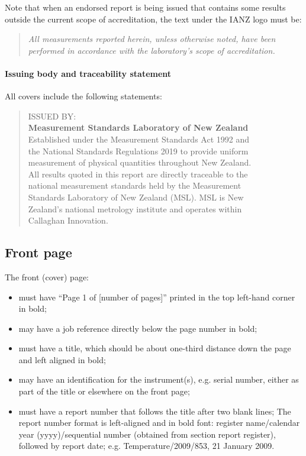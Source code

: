 Note that when an endorsed report is being issued that contains some results outside the current scope of accreditation, the text under the IANZ logo must be:
\begin{quote}
\textit{All measurements reported herein, unless otherwise noted, have been performed in accordance with the laboratory's scope of accreditation.}
\end{quote}

\paragraph{Issuing body and traceability statement}
All covers include the following statements:

\begin{quote}\begin{minipage}{.7\textwidth}
ISSUED BY: \\
\textbf{Measurement Standards Laboratory of New Zealand} \\[\baselineskip]
Established under the Measurement Standards Act 1992 and\\
the National Standards Regulations 2019 to provide uniform\\ 
measurement of physical quantities throughout New Zealand.\\

All results quoted in this report are directly traceable to the\\
national measurement standards held by the Measurement\\ 
Standards Laboratory of New Zealand (MSL). MSL is New\\ 
Zealand's national metrology institute and operates within\\ 
Callaghan Innovation.
\end{minipage}\end{quote}

\subsection{Front page}
The front (cover) page:
\begin{itemize}
\item	must have ``Page 1 of [number of pages]'' printed in the top left-hand corner in bold;
\item	may have a job reference directly below the page number in bold;
\item	must have a title, which should be about one-third distance down the page and left aligned in bold;
\item	may have an identification for the instrument(s), e.g. serial number, either as part of the title or elsewhere on the front page;
\item	must have a report number that follows the title after two blank lines; 
The report number format is left-aligned and in bold font: register name/calendar year (yyyy)/sequential number (obtained from section report register), followed by report date; e.g. Temperature/2009/853, 21 January 2009.
\end{itemize}

